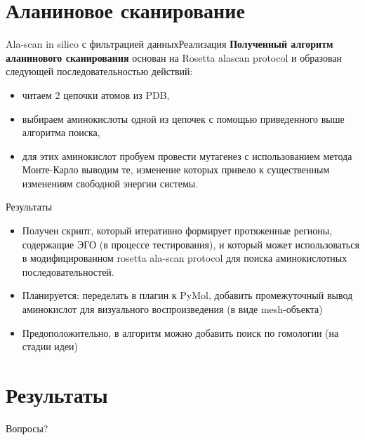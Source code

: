 \documentclass[12pt, xcolor={dvipsnames}]{beamer}
\begin{document}
\section{Аланиновое сканирование}

\begin{frame}{Ala-scan in silico с фильтрацией данных}{Реализация}
\textbf{Полученный алгоритм аланинового сканирования} основан на Rosetta alascan protocol и образован следующей последовательностью действий:
\begin{itemize}
\item читаем 2 цепочки атомов из PDB,
\item выбираем аминокислоты одной из цепочек с помощью приведенного выше алгоритма поиска,
\item для этих аминокислот пробуем провести мутагенез с использованием метода Монте-Карло выводим те, изменение которых привело к существенным изменениям свободной энергии системы.
\end{itemize}
\end{frame}

\begin{frame}{Результаты}
\begin{itemize}
\item Получен скрипт, который итеративно формирует протяженные регионы, содержащие ЭГО (в процессе тестирования), и который может использоваться в модифицированном rosetta ala-scan protocol для поиска аминокислотных последовательностей.
\item Планируется: переделать в плагин к PyMol, добавить промежуточный вывод аминокислот для визуального воспроизведения (в виде mesh-объекта)
\item Предоположительно, в алгоритм можно добавить поиск по гомологии (на стадии идеи)
\end{itemize}
\end{frame}

\section{Результаты}

\begin{frame}{}
Вопросы?
\end{frame}
\end{document}
